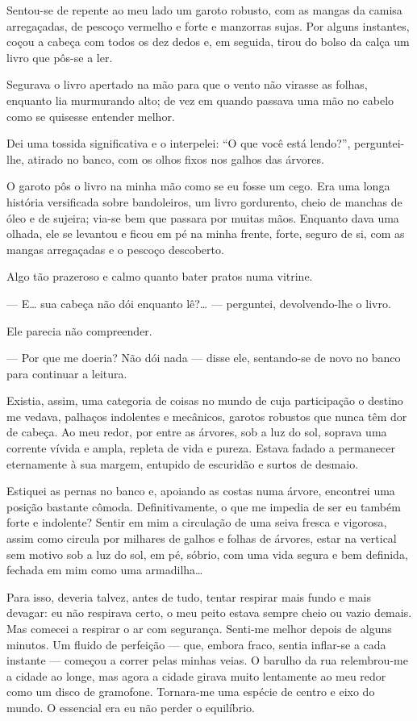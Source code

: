 Sentou-se de repente ao meu lado um garoto robusto, com as mangas da camisa arregaçadas, de pescoço vermelho e forte e manzorras sujas. Por alguns instantes, coçou a cabeça com todos os dez dedos e, em seguida, tirou do bolso da calça um livro que pôs-se a ler.

Segurava o livro apertado na mão para que o vento não virasse as folhas, enquanto lia murmurando alto; de vez em quando passava uma mão no cabelo como se quisesse entender melhor.

Dei uma tossida significativa e o interpelei: ``O que você está lendo?'', perguntei-lhe, atirado no banco, com os olhos fixos nos galhos das árvores.

O garoto pôs o livro na minha mão como se eu fosse um cego. Era uma longa história versificada sobre bandoleiros, um livro gordurento, cheio de manchas de óleo e de sujeira; via-se bem que passara por muitas mãos. Enquanto dava uma olhada, ele se levantou e ficou em pé na minha frente, forte, seguro de si, com as mangas arregaçadas e o pescoço descoberto.

Algo tão prazeroso e calmo quanto bater pratos numa vitrine.

--- E\ldots{} sua cabeça não dói enquanto lê?\ldots{} --- perguntei, devolvendo-lhe o livro.

Ele parecia não compreender.

--- Por que me doeria? Não dói nada --- disse ele, sentando-se de novo no banco para continuar a leitura.

Existia, assim, uma categoria de coisas no mundo de cuja participação o destino me vedava, palhaços indolentes e mecânicos, garotos robustos que nunca têm dor de cabeça. Ao meu redor, por entre as árvores, sob a luz do sol, soprava uma corrente vívida e ampla, repleta de vida e pureza. Estava fadado a permanecer eternamente à sua margem, entupido de escuridão e surtos de desmaio.

Estiquei as pernas no banco e, apoiando as costas numa árvore, encontrei uma posição bastante cômoda. Definitivamente, o que me impedia de ser eu também forte e indolente? Sentir em mim a circulação de uma seiva fresca e vigorosa, assim como circula por milhares de galhos e folhas de árvores, estar na vertical sem motivo sob a luz do sol, em pé, sóbrio, com uma vida segura e bem definida, fechada em mim como uma armadilha\ldots{}

Para isso, deveria talvez, antes de tudo, tentar respirar mais fundo e mais devagar: eu não respirava certo, o meu peito estava sempre cheio ou vazio demais. Mas comecei a respirar o ar com segurança. Senti-me melhor depois de alguns minutos. Um fluido de perfeição --- que, embora fraco, sentia inflar-se a cada instante --- começou a correr pelas minhas veias. O barulho da rua relembrou-me a cidade ao longe, mas agora a cidade girava muito lentamente ao meu redor como um disco de gramofone. Tornara-me uma espécie de centro e eixo do mundo. O essencial era eu não perder o equilíbrio.

